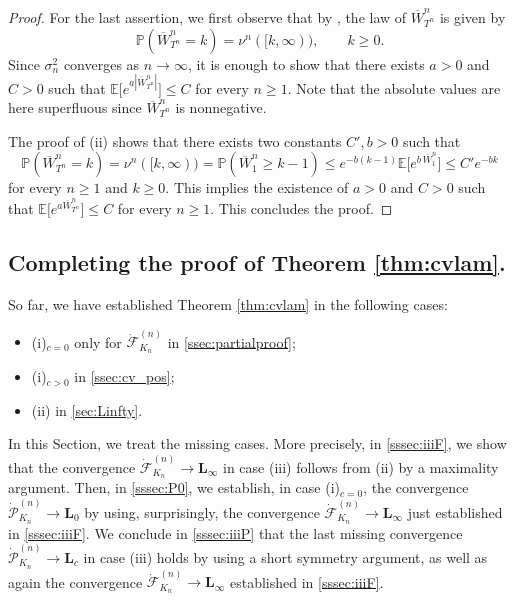 \documentclass[10pt]{amsart}
\theoremstyle{definition}\newtheorem{defi}[theo]{Definition}\newtheorem{rema}[theo]{Remark}\newtheorem{exam}[theo]{Example}\newtheorem{exem}[theo]{Example}\newtheorem{nota}[theo]{Notation}
\renewcommand{\P}{\mathbb{P}}
\newcommand{\E}{\mathbb{E}}
\def\dFKn{\dot{\mathcal{F}}^{(n)}_{K_{n}}}
\def\dPKn{\dot{\mathcal{P}}^{(n)}_{K_{n}}}
\renewcommand\Pr[1]{\mathbb{P}\left(#1\right)}
\begin{document}
\begin{proof}
For the last assertion, we first observe that by \cite[Lemma 1.9]{LG05}, the law of $\overline{W}^{n}_{T^{n}}$ is given by
\[\Pr{\overline{W}^{n}_{T^{n}}=k}=\nu^{n}([k,\infty)), \qquad k \geq 0.\]
Since $\sigma_{n}^{2}$ converges as $n \rightarrow \infty$,
it is enough to show that there exists $a>0$ and $C>0$
such that $\E\big[e^{a |\overline{W}^{n}_{T^{n}}|}\big] \leq C$ for every $n \geq 1$.
Note that the absolute values are here superfluous since $\overline{W}^{n}_{T^{n}}$
is nonnegative.

The proof of (ii) shows that there exists two constants $C',b>0$ such that
\[\Pr{\overline{W}^{n}_{T^{n}}=k}=\nu^{n}([k,\infty)) = \P(\overline{W}^{n}_{1} \geq k-1)  \leq e^{-b(k-1)} \E\big[ e^{b\, \overline{W}^{n}_1} \big]\le  C' e^{-bk}\]
for every $n \geq 1$ and $ k \geq 0$.
This implies the existence of $a>0$ and $C>0$ such that $\E\big[e^{a \overline{W}^{n}_{T^{n}}}\big] \leq C$ for every $n \geq 1$. This concludes the proof.
 \end{proof}


\subsection{Completing the proof of Theorem \ref{thm:cvlam}.} So far, we have established Theorem \ref{thm:cvlam} in the following cases:
\begin{itemize}
\item (i)$_{c=0}$ only for $ \dFKn$ in \cref{ssec:partialproof};
\item (i)$_{c>0}$ in \cref{ssec:cv_pos};
\item (ii) in \cref{sec:Linfty}.
\end{itemize}

In this Section, we treat the missing cases. More precisely, in \cref{sssec:iiiF}, we show that the convergence $\dFKn \rightarrow \mathbf{L}_{\infty}$  in case (iii)  follows from (ii) by a maximality argument. Then, in \cref{sssec:P0}, we establish, in case (i)$_{c=0}$, the  convergence $\dPKn \rightarrow \mathbf{L}_{0}$ by using, surprisingly, the convergence $ \dFKn \rightarrow \mathbf{L}_{\infty}$ just established in \cref{sssec:iiiF}. We conclude in \cref{sssec:iiiP} that   the last missing convergence $\dPKn \rightarrow \mathbf{L}_{c}$ in case (iii) holds by using a short symmetry argument,  as well as again the convergence $ \dFKn \rightarrow \mathbf{L}_{\infty}$  established in \cref{sssec:iiiF}.
\end{document}
